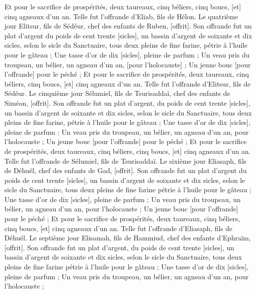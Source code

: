 \begin{multicols}{2}
Et pour le sacrifice de prospérités, deux taureaux, cinq béliers, cinq boucs, [et] cinq agneaux d'un an. Telle fut l'offrande d'Eliab, fils de Hélon.
Le quatrième jour Elitsur, fils de Sédéur, chef des enfants de Ruben, [offrit].
Son offrande fut un plat d'argent du poids de cent trente [sicles], un bassin d'argent de soixante et dix sicles, selon le sicle du Sanctuaire, tous deux pleins de fine farine, pétrie à l'huile pour le gâteau ;
Une tasse d'or de dix [sicles], pleine de parfum ;
Un veau pris du troupeau, un bélier, un agneau d'un an, [pour l'holocauste] ;
Un jeune bouc [pour l'offrande] pour le péché ;
Et pour le sacrifice de prospérités, deux taureaux, cinq béliers, cinq boucs, [et] cinq agneaux d'un an. Telle fut l'offrande d'Elitsur, fils de Sédéur.
Le cinquième jour Sélumiel, fils de Tsurisaddaï, chef des enfants de Siméon, [offrit].
Son offrande fut un plat d'argent, du poids de cent trente [sicles], un bassin d'argent de soixante et dix sicles, selon le sicle du Sanctuaire, tous deux pleins de fine farine, pétrie à l'huile pour le gâteau ;
Une tasse d'or de dix [sicles], pleine de parfum ;
Un veau pris du troupeau, un bélier, un agneau d'un an, pour l'holocauste ;
Un jeune bouc [pour l'offrande] pour le péché ;
Et pour le sacrifice de prospérités, deux taureaux, cinq béliers, cinq boucs, [et] cinq agneaux d'un an. Telle fut l'offrande de Sélumiel, fils de Tsurisaddaï.
Le sixième jour Eliasaph, fils de Déhuël, chef des enfants de Gad, [offrit].
Son offrande fut un plat d'argent du poids de cent trente [sicles], un bassin d'argent de soixante et dix sicles, selon le sicle du Sanctuaire, tous deux pleins de fine farine pétrie à l'huile pour le gâteau ;
Une tasse d'or de dix [sicles], pleine de parfum ;
Un veau pris du troupeau, un bélier, un agneau d'un an, pour l'holocauste ;
Un jeune bouc [pour l'offrande] pour le péché ;
Et pour le sacrifice de prospérités, deux taureaux, cinq béliers, cinq boucs, [et] cinq agneaux d'un an. Telle fut l'offrande d'Eliasaph, fils de Déhuël.
Le septième jour Elisamah, fils de Hammiud, chef des enfants d'Ephraïm, [offrit].
Son offrande fut un plat d'argent, du poids de cent trente [sicles], un bassin d'argent de soixante et dix sicles, selon le sicle du Sanctuaire, tous deux pleins de fine farine pétrie à l'huile pour le gâteau ;
Une tasse d'or de dix [sicles], pleine de parfum ;
Un veau pris du troupeau, un bélier, un agneau d'un an, pour l'holocauste ;

\end{multicols}
